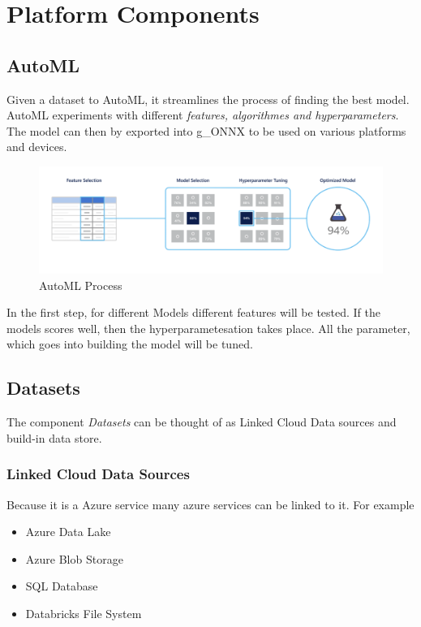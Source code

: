 \section{Platform Components}

\subsection{AutoML}
Given a dataset to AutoML, it streamlines the process of finding the best model.\\

AutoML experiments with different \textit{features, algorithmes and hyperparameters}. The model can then by exported into \gls{g_ONNX} to be used on various platforms and devices. 

\begin{figure}[H]
	\centering
	\includegraphics[scale = 0.4]{attachment/chapter_10/Scc004}
	\caption{AutoML Process}
\end{figure}

In the first step, for different Models different features will be tested. If the models scores well, then the hyperparametesation takes place. All the parameter, which goes into building the model will be tuned.

\subsection{Datasets}
The component \textit{Datasets} can be thought of as Linked Cloud Data sources and build-in data store.

\subsubsection{Linked Cloud Data Sources}

Because it is a Azure service many azure services can be linked to it. For example
\begin{itemize}
	\item Azure Data Lake
	\item Azure Blob Storage
	\item SQL Database
	\item Databricks File System
\end{itemize}

